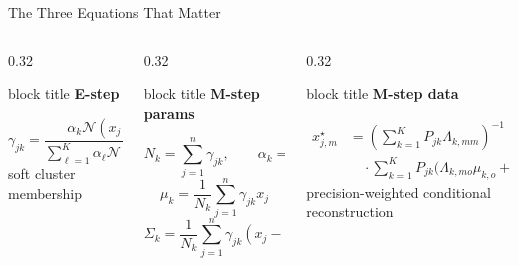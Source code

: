 \begin{frame}[shrink=10]{The Three Equations That Matter}
    \small
    \begin{columns}[T,onlytextwidth]
        \begin{column}{0.32\textwidth}
            \begin{beamercolorbox}[sep=0.8em, rounded=true, shadow=true]{block title}
                \textbf{E-step}
            \end{beamercolorbox}
            \[
                \gamma_{jk}=
                \frac{\alpha_k\mathcal{N}(x_j\mid \mu_k,\Sigma_k)}
                {\sum_{\ell=1}^{K}\alpha_{\ell}\mathcal{N}(x_j\mid \mu_{\ell},\Sigma_{\ell})}
            \]
            \vspace{0.1cm}
            \centering
            \small soft cluster membership
        \end{column}
        \begin{column}{0.32\textwidth}
            \begin{beamercolorbox}[sep=0.8em, rounded=true, shadow=true]{block title}
                \textbf{M-step params}
            \end{beamercolorbox}
            \[
                N_k=\sum_{j=1}^{n}\gamma_{jk},\qquad
                \alpha_k=\frac{N_k}{n}
            \]
            \[
                \mu_k=\frac{1}{N_k}\sum_{j=1}^{n}\gamma_{jk}x_j
            \]
            \[
                \Sigma_k=\frac{1}{N_k}\sum_{j=1}^{n}\gamma_{jk}(x_j-\mu_k)(x_j-\mu_k)^\top
            \]
        \end{column}
        \begin{column}{0.32\textwidth}
            \begin{beamercolorbox}[sep=0.8em, rounded=true, shadow=true]{block title}
                \textbf{M-step data}
            \end{beamercolorbox}
            \[
            \begin{aligned}
                x_{j,m}^{\star}
                &=
                \left(\sum_{k=1}^{K}P_{jk}\Lambda_{k,mm}\right)^{-1} \\
                &\quad \cdot
                \sum_{k=1}^{K}
                P_{jk}
                \Big(
                \Lambda_{k,mo}\mu_{k,o}
                +\Lambda_{k,mm}\mu_{k,m}
                -\Lambda_{k,mo}x_{j,o}
                \Big)
            \end{aligned}
            \]
            \centering
            \small precision-weighted conditional reconstruction
        \end{column}
    \end{columns}
\end{frame}
